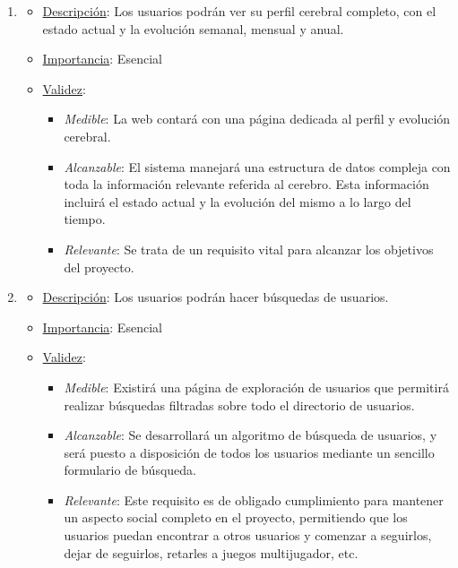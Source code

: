 \begin{enumerate}
\item %
  \begin{itemize}
  \item \underline{Descripción}: Los usuarios podrán ver su perfil cerebral completo, con el estado actual y la evolución semanal, mensual y anual.
  \item \underline{Importancia}: Esencial
  \item \underline{Validez}:
    \begin{itemize}
    \item \textit{Medible}: La web contará con una página dedicada al perfil y evolución cerebral.
    \item \textit{Alcanzable}: El sistema manejará una estructura de datos compleja con toda la información relevante referida al cerebro. Esta información incluirá el estado actual y la evolución del mismo a lo largo del tiempo.
    \item \textit{Relevante}: Se trata de un requisito vital para alcanzar los objetivos del proyecto.
    \end{itemize}
  \end{itemize}

\item %
  \begin{itemize}
  \item \underline{Descripción}: Los usuarios podrán hacer búsquedas de usuarios.
  \item \underline{Importancia}: Esencial
  \item \underline{Validez}:
    \begin{itemize}
    \item \textit{Medible}: Existirá una página de exploración de usuarios que permitirá realizar búsquedas filtradas sobre todo el directorio de usuarios.
    \item \textit{Alcanzable}: Se desarrollará un algoritmo de búsqueda de usuarios, y será puesto a disposición de todos los usuarios mediante un sencillo formulario de búsqueda.
    \item \textit{Relevante}: Este requisito es de obligado cumplimiento para mantener un aspecto social completo en el proyecto, permitiendo que los usuarios puedan encontrar a otros usuarios y comenzar a seguirlos, dejar de seguirlos, retarles a juegos multijugador, etc.
    \end{itemize}
  \end{itemize}


\end{enumerate}
